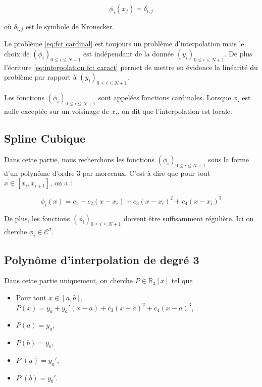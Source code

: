 \begin{equation}
\phi_i ( x_j ) = \delta_{i,j}
\label{eq:fct cardinal}
\end{equation}

où $\delta_{i,j}$ est le symbole de Kronecker.

\begin{remarque}
Le problème \eqref{eq:fct cardinal} est toujours un problème d'interpolation mais le choix de $(\phi_i)_{0 \leq i \leq N+1}$ est indépendant de la donnée $(y_i)_{0 \leq i \leq N+1}$. De plus l'écriture \eqref{eq:interpolation fct caract} permet de mettre en évidence la linéarité du problème par rapport à $(y_i)_{0 \leq i \leq N+1}$.
\end{remarque}

Les fonctions $(\phi_i)_{0 \leq i \leq N+1}$ sont appelées fonctions cardinales. Lorsque $\phi_i$ est nulle exceptée sur un voisinage de $x_i$, on dit que l'interpolation est locale.

\subsection{Spline Cubique}

Dans cette partie, nous recherchons les fonctions $(\phi_i)_{0 \leq i \leq N+1}$ sous la forme d'un polynôme d'ordre 3 par morceaux. C'est à dire que pour tout $x \in [x_i, x_{i+1}]$, on a :

\begin{equation}
\phi_i(x) = c_1 + c_2 (x-x_i) + c_3 (x-x_i)^2 + c_4 (x-x_i)^3
\end{equation}

De plus, les fonctions $(\phi_i)_{0 \leq i \leq N+1}$ doivent être suffisamment régulière. Ici on cherche $\phi_i \in \mathcal{C}^2$.

\subsection{Polynôme d'interpolation de degré 3}

Dans cette partie uniquement, on cherche $P\in \mathbb{R}_3 [x]$ tel que 

\begin{itemize}
\item Pour tout $x \in [a,b]$, $P(x) = y_a + y_a' (x-a) + c_3 (x-a)^2 + c_4 (x-a)^3$,
\item $P(a)=y_a$,
\item $P(b)=y_b$,
\item $P'(a)=y_a'$,
\item $P'(b)=y_b'$.
\end{itemize}

